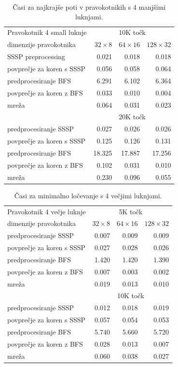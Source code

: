 \documentclass[a4paper, 12pt]{book}
\begin{document}
\begin{table}
\begin{center}
\begin{tabular}{l*{3}{r}}
Pravokotnik 4 small luknje & \multicolumn{3}{c}{10K točk} \\
dimenzije pravokotnika	&	$32\times 8$	&	$64\times 16$	&	$128\times 32$	\\						
\hline
SSSP preprocessing	&	0.021	&	0.018	&	0.018	\\
povprečje za koren s SSSP	&	0.056	&	0.058	&	0.064	\\
predprocesiranje BFS	&	6.291	&	6.102	&	6.364	\\
povprečje za koren z BFS	&	0.033	&	0.010	&	0.004	\\
mreža				&	0.064	&	0.031	&	0.023	\\
\hline
& \multicolumn{3}{c}{20K točk} \\
\hline
predprocesiranje SSSP &  0.027	&	0.026	&	0.026 \\
povprečje za koren s SSSP &	0.125	&	0.126	&	0.131 \\
predprocesiranje BFS &	18.325	&	17.887	&	17.256	\\
povprečje za koren z BFS & 0.102	&	0.031	&	0.010 \\
mreža &	0.230	&	0.096	&	0.055 
\end{tabular}
\caption{Časi za najkrajše poti v pravokotnikih s 4 manjšimi luknjami.}
\label{table4}
\end{center}
\end{table}


\begin{table}
\begin{center}
\begin{tabular}{l*{3}{r}}
Pravokotnik 4 večje luknje & \multicolumn{3}{c}{5K točk} \\
dimenzije pravokotnika	&	$32\times 8$	&	$64\times 16$	&	$128\times 32$ \\						
\hline
predprocesiranje SSSP	&	0.007	&	0.009	&	0.009	\\
povprečje za koren s SSSP	&	0.027	&	0.028	&	0.026	\\
predprocesiranje BFS	&	1.420	&	1.420	&	1.390	\\
povprečje za koren z BFS	&	0.007	&	0.003	&	0.002	\\
mreža				&	0.019	&	0.013	&	0.010	\\
\hline
& \multicolumn{3}{c}{10K točk} \\
\hline
predprocesiranje SSSP &	0.012	&	0.018	&	0.019	\\
povprečje za koren s SSSP &	0.057	&	0.054	&	0.053	\\
predprocesiranje BFS &	5.740	&	5.660	&	5.720	\\
povprečje za koren z BFS &	0.028	&	0.013	&	0.007	\\
mreža &	0.060	&	0.038	&	0.027 
\end{tabular}
\caption{Časi za minimalno ločevanje s 4 večjimi luknjami.}
\label{table5}
\end{center}
\end{table}
\end{document}
